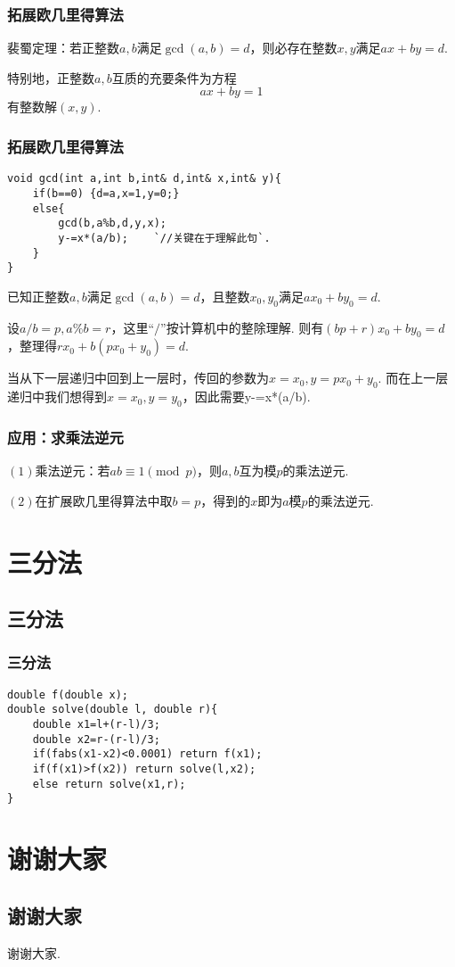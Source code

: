 \documentclass[xcolor=dvipsnames]{beamer}
\def\byh{\!\!“}
\def\eyh{”\!\!}
\def\dou{，\!\!}
\begin{document}
    \begin{frame}
        \frametitle{拓展欧几里得算法}
        
        裴蜀定理：\!\!若正整数$a,b$满足$\gcd(a,b)=d$\dou 则必存在整数$x,y$满足$ax+by=d$.\pause

        特别地\dou 正整数$a,b$互质的充要条件为方程$$ax+by=1$$有整数解$(x,y)$.
    \end{frame}

    \begin{frame}
        \frametitle{拓展欧几里得算法}
        \begin{lstlisting}[basicstyle=\tiny\ttfamily,numberstyle=\tiny\ttfamily]
void gcd(int a,int b,int& d,int& x,int& y){
    if(b==0) {d=a,x=1,y=0;}
    else{
        gcd(b,a%b,d,y,x);
        y-=x*(a/b);    `//关键在于理解此句`.
    }
}
        \end{lstlisting}\pause
        
        {\small 已知正整数$a,b$满足$\gcd(a,b)=d$\dou 且整数$x_0,y_0$满足$ax_0+by_0=d$.\pause

        设$a/b=p,a\% b=r$\dou 这里\byh $/$\eyh 按计算机中的整除理解. 则有$(bp+r)x_0+by_0=d$\dou 整理得$rx_0+b(px_0+y_0)=d$.\pause

        当从下一层递归中回到上一层时\dou 传回的参数为$x=x_0,y=px_0+y_0$. 而在上一层递归中我们想得到$x=x_0,y=y_0$\dou 因此需要{\ttfamily y-=x*(a/b)}.}
    \end{frame}

    \begin{frame}
        \frametitle{应用：\!\!求乘法逆元}

        $(1)$乘法逆元：\!\!若$ab\equiv 1\pmod{p}$\dou 则$a,b$互为模$p$的乘法逆元.\pause

        $(2)$在扩展欧几里得算法中取$b=p$\dou 得到的$x$即为$a$模$p$的乘法逆元.
    \end{frame}

    \section{三分法}

    \subsection{三分法}

    \begin{frame}
        \frametitle{三分法}

        \begin{lstlisting}
double f(double x);
double solve(double l, double r){
    double x1=l+(r-l)/3;
    double x2=r-(r-l)/3;
    if(fabs(x1-x2)<0.0001) return f(x1);
    if(f(x1)>f(x2)) return solve(l,x2);
    else return solve(x1,r);
}
        \end{lstlisting}
    \end{frame}

    \section*{谢谢大家}

    \subsection*{谢谢大家}

    \begin{frame}[fragile]
        谢谢大家.
    \end{frame}
\end{document}
